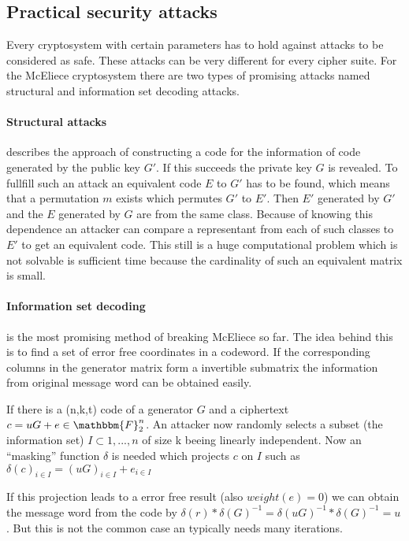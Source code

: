 \subsection*{Practical security attacks}
\label{keylength}
Every cryptosystem with certain parameters has to hold against attacks to be considered as safe. These attacks can be very different for every cipher suite. 
For the McEliece cryptosystem there are two types of promising attacks named structural and information set decoding attacks. 
\paragraph*{Structural attacks} describes the approach of constructing a code for the information of code generated by the public key $G'$. If this succeeds the private key $G$ is revealed. 
To fullfill such an attack an equivalent code $E$ to $G'$ has to be found, which means that a permutation $m$ exists which permutes $G'$ to $E'$. Then $E'$ generated by $G'$ and the $E$ generated by $G$ are from the same class. 
Because of knowing this dependence an attacker can compare a representant from each of such classes to $E'$ to get an equivalent code. This still is a huge computational problem which is not solvable is sufficient time because the cardinality of such an equivalent matrix is small. \cite{au2003mceliece}


\paragraph*{Information set decoding} is the most promising method of breaking McEliece so far. The idea behind this is to find a set of error free coordinates in a codeword. If the corresponding columns in the generator matrix form a invertible submatrix the information from original message word can be obtained easily. 

 If there is a (n,k,t) code of a generator $G$ and a ciphertext $c = uG + e \in  \mathbbm{F}^n_2$. An attacker now randomly selects a subset (the information set) $I \subset 1, ..., n$ of size k beeing linearly independent. Now an ``masking'' function $\delta$ is needed which projects $c$ on $I$ such as $\delta(c)_{i \in I} = (uG)_{i\in I}+e_{i\in I}$
 
 If this projection leads to a error free result (also $weight(e) = 0$) we can obtain the message word from the code by $\delta(r)* \delta(G)^{-1} = \delta(uG)^{-1}*\delta(G)^{-1} = u$. 
 But this is not the common case an typically needs many iterations.
 
